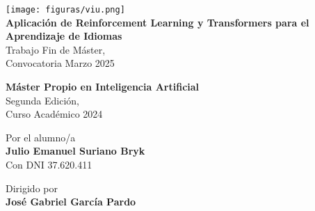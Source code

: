 \begin{titlepage}
  \begin{center}
    \texttt{[image: figuras/viu.png]} \\[1cm]

    \huge \textbf{Aplicación de Reinforcement Learning y Transformers para el Aprendizaje de Idiomas} \\[1cm]

    \large Trabajo Fin de Máster, \\
    \large Convocatoria Marzo 2025 \\

    \vspace{2cm}

    \Large \textbf{Máster Propio en Inteligencia Artificial} \\[0.5cm]
    \large Segunda Edición, \\
    \large Curso Académico 2024 \\

    \vspace{2cm}

    \large Por el alumno/a \\
    \Large \textbf{Julio Emanuel Suriano Bryk} \\
    \large Con DNI 37.620.411 \\[1cm]

    \vspace{1cm}

    \large Dirigido por \\
    \Large \textbf{José Gabriel García Pardo} \\
  \end{center}
\end{titlepage}